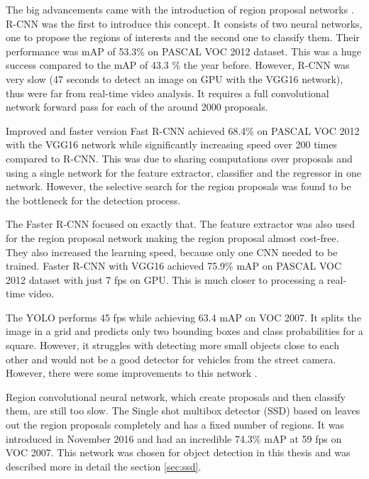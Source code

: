 \documentclass[a4paper,11pt,titlepage,twoside]{article}
\numberwithin{figure}{section}
\begin{document}
The big advancements came with the introduction of region proposal networks \cite{girshick2016region}. R-CNN \cite{girshick2014rich} was the first to introduce this concept. It consists of two neural networks, one to propose the regions of interests and the second one to classify them. Their performance was mAP of 53.3\% on PASCAL VOC 2012 dataset. This was a huge success compared to the mAP of 43.3 \%\cite{carreira2012cpmc} the year before. However, R-CNN was very slow (47 seconds to detect an image on GPU with the VGG16 \cite{simonyan2014very} network), thus were far from real-time video analysis. It requires a full convolutional network forward pass for each of the around 2000 proposals.

Improved and faster version Fast R-CNN \cite{girshick2015fast} achieved 68.4\% on PASCAL VOC 2012 with the VGG16 network while significantly increasing speed over 200 times compared to R-CNN. This was due to sharing computations over proposals and using a single network for the feature extractor, classifier and the regressor in one network. However, the selective search for the region proposals was found to be the bottleneck for the detection process.

The Faster R-CNN focused on exactly that. The feature extractor was also used for the region proposal network making the region proposal almost cost-free. They also increased the learning speed, because only one CNN needed to be trained. Faster R-CNN with VGG16 achieved 75.9\% mAP on PASCAL VOC 2012 dataset with just 7 fps on GPU. This is much closer to processing a real-time video.

The YOLO \cite{redmon2016you} performs 45 fps while achieving 63.4 mAP on VOC 2007. It splits the image in a grid and predicts only two bounding boxes and class probabilities for a square. However, it struggles with detecting more small objects close to each other and would not be a good detector for vehicles from the street camera. However, there were some improvements to this network \cite{redmon2017yolo9000, redmon2018yolov3}.

Region convolutional neural network, which create proposals and then classify them, are still too slow. The Single shot multibox detector (SSD) \cite{liu2016ssd} based on \cite{erhan2014scalable} leaves out the region proposals completely and has a fixed number of regions. It was introduced in November 2016 and had an incredible 74.3\% mAP at 59 fps on VOC 2007. This network was chosen for object detection in this thesis and was described more in detail the section \ref{sec:ssd}. 
\end{document}
